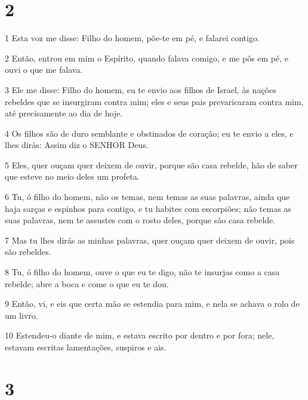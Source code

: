 \chapter{2}

\par 1 Esta voz me disse: Filho do homem, põe-te em pé, e falarei contigo.
\par 2 Então, entrou em mim o Espírito, quando falava comigo, e me pôs em pé, e ouvi o que me falava.
\par 3 Ele me disse: Filho do homem, eu te envio aos filhos de Israel, às nações rebeldes que se insurgiram contra mim; eles e seus pais prevaricaram contra mim, até precisamente ao dia de hoje.
\par 4 Os filhos são de duro semblante e obstinados de coração; eu te envio a eles, e lhes dirás: Assim diz o SENHOR Deus.
\par 5 Eles, quer ouçam quer deixem de ouvir, porque são casa rebelde, hão de saber que esteve no meio deles um profeta.
\par 6 Tu, ó filho do homem, não os temas, nem temas as suas palavras, ainda que haja sarças e espinhos para contigo, e tu habites com escorpiões; não temas as suas palavras, nem te assustes com o rosto deles, porque são casa rebelde.
\par 7 Mas tu lhes dirás as minhas palavras, quer ouçam quer deixem de ouvir, pois são rebeldes.
\par 8 Tu, ó filho do homem, ouve o que eu te digo, não te insurjas como a casa rebelde; abre a boca e come o que eu te dou.
\par 9 Então, vi, e eis que certa mão se estendia para mim, e nela se achava o rolo de um livro.
\par 10 Estendeu-o diante de mim, e estava escrito por dentro e por fora; nele, estavam escritas lamentações, suspiros e ais.

\chapter{3}

